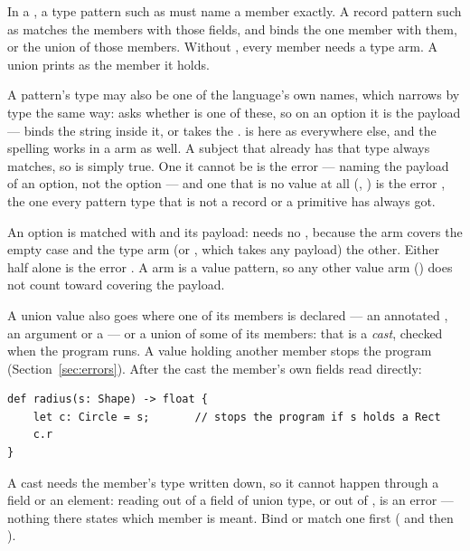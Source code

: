 \noindent In a , a type pattern such as  must
name a member exactly. A record pattern such as
 matches the members with those fields, and
binds the one member with them, or the union of those members. Without
\ic{\_}, every member needs a type arm. A union prints as the member it
holds.

A pattern's type may also be one of the language's own names, which
narrows by type the same way:  asks whether
 is one of these, so on an option it is the payload --- 
binds the string inside it, or takes the .  is 
here as everywhere else, and the spelling works in a  arm as well.
A subject that already has that type always matches, so 
is simply true. One it cannot be is the error  --- naming the payload of an option, not the option --- and one that
is no value at all (, ) is the error , the one every pattern type that is
not a record or a primitive has always got.

An option is matched with  and its payload:  needs no \ic{\_}, because the  arm covers the empty
case and the type arm (or , which takes any payload) the other.
Either half alone is the error . A  arm is a value pattern, so any other value arm
() does not count toward covering the payload.

A union value also goes where one of its members is declared --- an
annotated , an argument or a  --- or a union of some of
its members: that is a \emph{cast}, checked when the program runs. A value
holding another member stops the program (Section~\ref{sec:errors}). After the
cast the member's own fields read directly:

\begin{lstlisting}
def radius(s: Shape) -> float {
    let c: Circle = s;       // stops the program if s holds a Rect
    c.r
}
\end{lstlisting}

A cast needs the member's type written down, so it cannot happen through a
field or an element: reading  out of a field of union type, or out of
, is an error --- nothing there states which member is meant.
Bind or match one first ( and then ).

